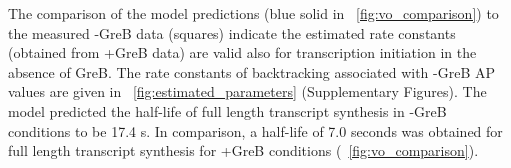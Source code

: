 The comparison of the model predictions (blue solid in
\FIG~\ref{fig:vo_comparison}) to the measured -GreB data (squares) indicate
the estimated rate constants (obtained from +GreB data) are valid also for
transcription initiation in the absence of GreB. The rate constants of
backtracking associated with -GreB AP values are given in
\FIG~\ref{fig:estimated_parameters} (Supplementary Figures). The model
predicted the half-life of full length transcript synthesis in -GreB
conditions to be 17.4 s. In comparison, a half-life of 7.0 seconds was
obtained for full length transcript synthesis for +GreB conditions
(\FIG~\ref{fig:vo_comparison}). 
% 
% 

